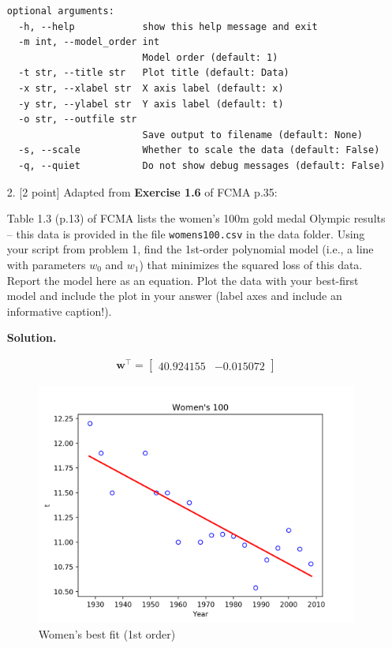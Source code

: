 \documentclass[10pt]{article}
\begin{document}
\begin{itemize}
\begin{verbatim}
optional arguments:
  -h, --help            show this help message and exit
  -m int, --model_order int
                        Model order (default: 1)
  -t str, --title str   Plot title (default: Data)
  -x str, --xlabel str  X axis label (default: x)
  -y str, --ylabel str  Y axis label (default: t)
  -o str, --outfile str
                        Save output to filename (default: None)
  -s, --scale           Whether to scale the data (default: False)
  -q, --quiet           Do not show debug messages (default: False)
\end{verbatim}

\item[2.] [2 point]
Adapted from {\bf Exercise 1.6} of FCMA p.35:

Table 1.3 (p.13) of FCMA lists the women's 100m gold medal Olympic results -- this data is provided in the file {\tt womens100.csv} in the data folder.  Using your script from problem 1, find the 1st-order polynomial model (i.e., a line with parameters $w_0$ and $w_1$) that minimizes the squared loss of this data.  Report the model here as an equation.  Plot the data with your best-first model and include the plot in your answer (label axes and include an informative caption!).

{\bf Solution.} 

\begin{eqnarray*}
\mathbf{w}^\top = \begin{bmatrix} 40.924155 & -0.015072 \end{bmatrix}
\end{eqnarray*}

\begin{figure}
\centering
  \includegraphics[width=\linewidth]{code/womens.png}
 \caption{Women's best fit (1st order)}
\label{label}
\end{figure}



\end{itemize}
\end{document}
